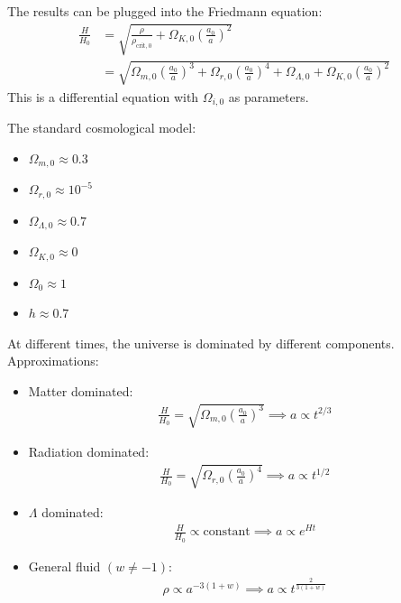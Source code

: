 The results can be plugged into the Friedmann equation:
\begin{align*}
	\frac{H}{H_0} 
	&= \sqrt{\frac{\rho}{\rho_{\text{crit}, 0}} + \Omega_{K,0} \left( \frac{a_0}{a} \right)^2 }\\
	&= \sqrt{
		\Omega_{m,0} \left( \frac{a_0}{a} \right)^3
		+ \Omega_{r,0} \left( \frac{a_0}{a} \right)^4
		+ \Omega_{\Lambda,0}
		+ \Omega_{K,0} \left( \frac{a_0}{a} \right)^2
	}
\end{align*}
This is a differential equation with $\Omega_{i,0}$ as parameters.

The standard cosmological model:
\begin{itemize}
	\item $\Omega_{m,0} \approx 0.3$
	\item $\Omega_{r,0} \approx 10^{-5}$
	\item $\Omega_{\Lambda,0} \approx 0.7$
	\item $\Omega_{K,0} \approx 0$
	\item $\Omega_0 \approx 1$
	\item $h \approx 0.7$
\end{itemize}

At different times, the universe is dominated by different components. Approximations:
\begin{itemize}
	\item Matter dominated:
	\begin{align*}
		\frac{H}{H_0} = \sqrt{\Omega_{m,0} \left( \frac{a_0}{a}\right)^3}
		\implies a \propto t^{2/3}
	\end{align*}
	\item Radiation dominated:
	\begin{align*}
		\frac{H}{H_0} = \sqrt{\Omega_{r,0} \left( \frac{a_0}{a} \right)^4}
		\implies a \propto t^{1/2}
	\end{align*}
	\item $\Lambda$ dominated:
	\begin{align*}
		\frac{H}{H_0} \propto \text{constant}
		\implies a \propto e^{H t}
	\end{align*}
	\item General fluid $(w \neq -1)$:
	\begin{align*}
		\rho \propto a^{-3(1+w)} \implies a \propto t^{\frac{2}{3(1+w)}}
	\end{align*}
\end{itemize}

